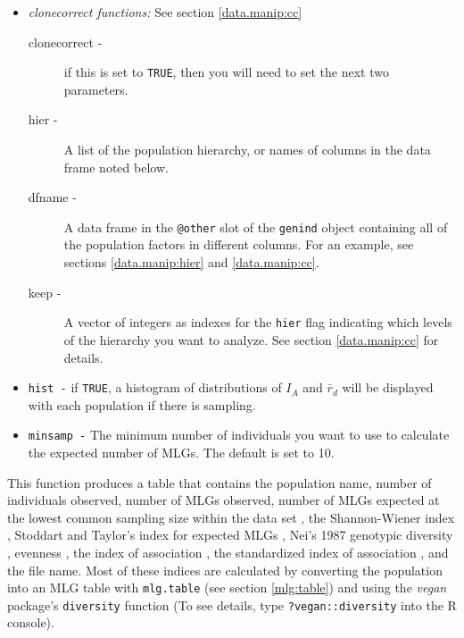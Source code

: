 \documentclass[letterpaper]{article}
\begin{document}
\begin{itemize}
  \item \emph{clonecorrect functions:} See section \ref{data.manip:cc}
  \begin{description}
    \item[clonecorrect -] if this is set to \texttt{TRUE}, then you will need to set the next two parameters.
    \item[hier -] A list of the population hierarchy, or names of columns in the data frame noted below.
    \item[dfname -] A data frame in the \texttt{@other} slot of the \texttt{genind} object containing all of the population factors in different columns. For an example, see sections \ref{data.manip:hier} and \ref{data.manip:cc}.
    \item[keep -] A vector of integers as indexes for the \texttt{hier} flag indicating which levels of the hierarchy you want to analyze. See section \ref{data.manip:cc} for details. 
  \end{description}
  \item \texttt{hist -} if \texttt{TRUE}, a histogram of distributions of $I_A$ and $\bar r_d$ will be displayed with each population if there is sampling.
  \item \texttt{minsamp -} The minimum number of individuals you want to use to calculate the expected number of MLGs. The default is set to 10.
\end{itemize}

This function produces a table that contains the population name, number of individuals observed, number of MLGs observed, number of MLGs expected at the lowest common sampling size within the data set \cite{Hurlbert:1971} \cite{Heck:1975}, the Shannon-Wiener index \cite{Shannon:1948}, Stoddart and Taylor's index for expected MLGs \cite{Stoddart:1988}, Nei's 1987 genotypic diversity \cite{Nei:1978}, evenness \cite{Pielou:1975}\cite{Ludwig:1988}\cite{Grunwald:2003}, the index of association \cite{Brown:1980}\cite{Smith:1993}, the standardized index of association \cite{Agapow:2001}, and the file name. Most of these indices are calculated by converting the population into an MLG table with \texttt{mlg.table} (see section \ref{mlg:table}) and using the \textit{vegan} package's \texttt{diversity} function (To see details, type \texttt{?vegan::diversity} into the R console).
\end{document}
